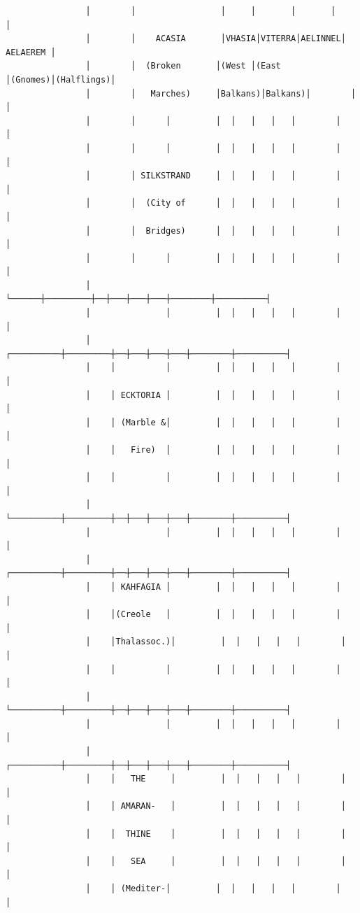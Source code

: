 \documentclass[11pt,letterpaper,twoside]{book}
\begin{document}
\begin{verbatim}
                │        │                 │     │       │       │            │
                │        │    ACASIA       │VHASIA│VITERRA│AELINNEL│ AELAEREM │
                │        │  (Broken       │(West │(East  │(Gnomes)│(Halflings)│
                │        │   Marches)     │Balkans)│Balkans)│        │          │
                │        │      │         │  │   │   │   │        │          │
                │        │      │         │  │   │   │   │        │          │
                │        │ SILKSTRAND     │  │   │   │   │        │          │
                │        │  (City of      │  │   │   │   │        │          │
                │        │  Bridges)      │  │   │   │   │        │          │
                │        │      │         │  │   │   │   │        │          │
                │        └──────┼─────────┼──┼───┼───┼───┼────────┼──────────┤
                │               │         │  │   │   │   │        │          │
                │    ┌──────────┼─────────┼──┼───┼───┼───┼────────┼──────────┤
                │    │          │         │  │   │   │   │        │          │
                │    │ ECKTORIA │         │  │   │   │   │        │          │
                │    │ (Marble &│         │  │   │   │   │        │          │
                │    │   Fire)  │         │  │   │   │   │        │          │
                │    │          │         │  │   │   │   │        │          │
                │    └──────────┼─────────┼──┼───┼───┼───┼────────┼──────────┤
                │               │         │  │   │   │   │        │          │
                │    ┌──────────┼─────────┼──┼───┼───┼───┼────────┼──────────┤
                │    │ KAHFAGIA │         │  │   │   │   │        │          │
                │    │(Creole   │         │  │   │   │   │        │          │
                │    │Thalassoc.)│         │  │   │   │   │        │          │
                │    │          │         │  │   │   │   │        │          │
                │    └──────────┼─────────┼──┼───┼───┼───┼────────┼──────────┤
                │               │         │  │   │   │   │        │          │
                │    ┌──────────┼─────────┼──┼───┼───┼───┼────────┼──────────┤
                │    │   THE     │         │  │   │   │   │        │          │
                │    │ AMARAN-   │         │  │   │   │   │        │          │
                │    │  THINE    │         │  │   │   │   │        │          │
                │    │   SEA     │         │  │   │   │   │        │          │
                │    │ (Mediter-│         │  │   │   │   │        │          │

\end{verbatim}
\end{document}
